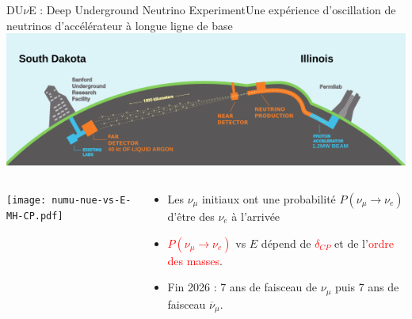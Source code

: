     \begin{frame}{DU$\nu$E : Deep Underground Neutrino Experiment}{Une expérience d'oscillation de neutrinos d'accélérateur à longue ligne de base}
        \includegraphics[width=\textwidth]{./pictures/dune.png}\\
        \begin{scriptsize}
        \vspace{0.4cm}
        \begin{columns}
            \begin{column}{0.75\textwidth}
                \texttt{[image: numu-nue-vs-E-MH-CP.pdf]}
            \end{column}
            \hspace{-0.5cm}
            \begin{column}{0.35\textwidth}
                 \begin{itemize}
                     \item Les $\nu_{\mu}$ initiaux ont une probabilité $P(\nu_{\mu}\to\nu_e)$ d'être des $\nu_e$ à l'arrivée
                     \item \textcolor{red}{$P(\nu_{\mu}\to\nu_e)$} vs $E$ dépend de \textcolor{red}{$\delta_{CP}$} et de l'\textcolor{red}{ordre des masses}.
                     \item Fin 2026 : 7 ans de faisceau de $\nu_{\mu}$ puis 7 ans de faisceau $\overline{\nu}_{\mu}$.
                 \end{itemize}
            \end{column}
        \end{columns}

\end{scriptsize}
\end{frame}
